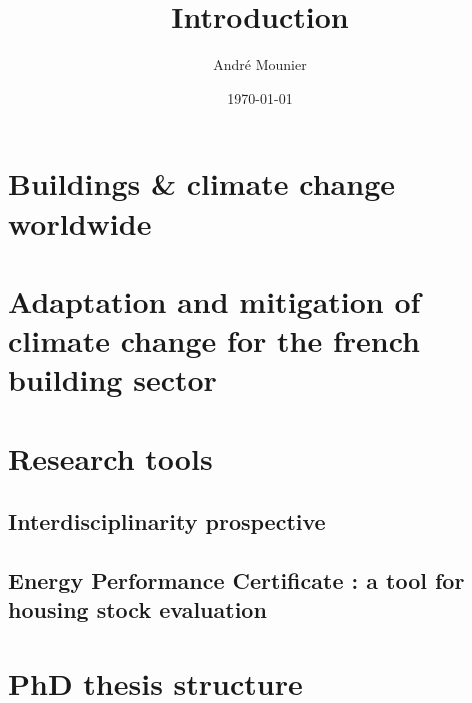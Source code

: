 \documentclass[11pt]{article}
\date{\today}
\title{Introduction}
\author{André Mounier}
\providecommand{\keywords}[1]
{
  \small    
  \textbf{\textit{Keywords~--}} #1
}
\begin{document}
\maketitle




\clearpage
\tableofcontents

\clearpage

\section{Buildings \& climate change worldwide} %
\label{sec:buildings_&_climate_change_worldwide}


\section{Adaptation and mitigation of climate change for the french building sector} %
\label{sec:adaptation_and_mitigation_of_climate_change_for_the_french_building_sector}

    


\section{Research tools} %
\label{sec:outils_de_recherche}

    \subsection{Interdisciplinarity prospective} %
    \label{sub:interdisciplinarity_prospective}
    

    \subsection{Energy Performance Certificate : a tool for housing stock evaluation} %
    \label{sub:energy_performance_certificate_a_tool_for_housing_stock_evaluation}
    


\section{PhD thesis structure} %
\label{sec:phd_thesis_structure}

\end{document}
